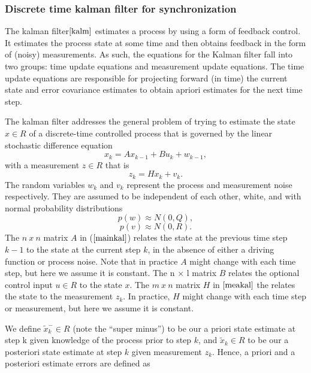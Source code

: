 \documentclass[journal]{IEEEtran}
\begin{document}
\subsubsection{\textbf{Discrete time kalman filter for synchronization}}
The kalman filter$\cite{kalm}$ estimates a process by using a form of feedback
control. It estimates the process state at some time and
then obtains feedback in the form of (noisy) measurements. As such,
the equations for the Kalman filter fall into two groups: time
update equations and measurement update equations. The time update
equations are responsible for projecting forward (in time) the
current state and error covariance estimates to obtain apriori
estimates for the next time step.
\par
The kalman filter addresses the general problem of trying to
estimate the state $x \in R$ of a discrete-time controlled process that is
governed by the linear stochastic difference equation
\begin{equation}
 x_k = Ax_{k-1} + Bu_k + w_{k-1} , \label{mainkal}
\end{equation}
with a measurement $z \in R$ that is
\begin{equation}
 z_k = Hx_k + v_k. \label{meakal}
\end{equation}
The random variables $w_k$ and $v_k$ represent the process and
measurement noise respectively. They are assumed to be
independent of each other, white, and with normal probability
distributions
\begin{equation}
 p(w) \approx N(0,Q),
\end{equation}
\begin{equation}
 p(v) \approx N(0,R).
\end{equation}
The $n\ x\ n$ matrix $A$ in ($\ref{mainkal}$) relates the state at the previous time step $k-1$ to the state at the current step $k$, in the absence of either a driving function or process noise. Note that in practice $A$ might change with each time step, but                                                                   
here we assume it is constant. The n × l matrix $B$ relates the optional control input $u \in R$ to the state $x$. The $m\ x\ n$ matrix $H$ in $\ref{meakal}$ the relates the state to the measurement $z_k$. In practice, $H$ might change with each time step or
measurement, but here we assume it is constant.
\par
We define $\tilde x_k^- \in R$ (note the “super minus”) to be our a priori state estimate at step k given knowledge of the process prior to step $k$, and $\tilde x_k \in R$ to be our a posteriori state estimate at step $k$ given measurement $z_k$. Hence, a priori and a posteriori estimate errors are defined as
\end{document}
